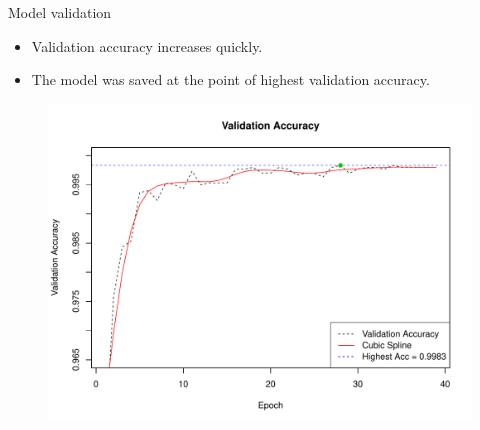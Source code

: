 \documentclass{beamer}
\begin{document}
\begin{frame}{Model validation}
\begin{itemize}
\item Validation accuracy increases quickly.
\item The model was saved at the point of highest validation accuracy.
\end{itemize}
\begin{figure}
\centering
\includegraphics[width=0.83\linewidth]{../Thesis_Docs/Images/7_valid_acc5.pdf}
\end{figure}
\end{frame}
\end{document}
